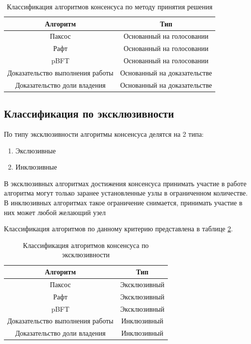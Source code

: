 \begin{table}[h!]
	\begin{center}
		\caption{Классификация алгоритмов консенсуса по методу принятия решения}
		\label{tbl:classif_method}
		\begin{tabular}{|c|c|}
		\hline
		\textbf{Алгоритм} & \textbf{Тип} \\
		\hline
		Паксос & Основанный на голосовании \\
		\hline
		Рафт & Основанный на голосовании \\
		\hline
		pBFT & Основанный на голосовании \\
		\hline
		Доказательство выполнения работы & Основанный на доказательстве \\
		\hline
		Доказательство доли владения & Основанный на доказательстве \\
		\hline
        \end{tabular}
	\end{center}        
\end{table}

        \subsection{Классификация по эксклюзивности}

            По типу эксклюзивности алгоритмы консенсуса делятся на 2 типа:
            
            \begin{enumerate}
                \item Экслюзивные
                \item Инклюзивные
            \end{enumerate}
            
            В эксклюзивных алгоритмах достижения консенсуса принимать участие в работе алгоритма могут только заранее установленные узлы в ограниченном количестве. В инклюзивных алгоритмах такое ограничение снимается, принимать участие в них может любой желающий узел
            
            Классификация алгоритмов по данному критерию представлена в таблице \ref{tbl:classif_inclusive}.
        
\begin{table}[h!]
	\begin{center}
		\caption{Классификация алгоритмов консенсуса по эксклюзивности}
		\label{tbl:classif_inclusive}
		\begin{tabular}{|c|c|}
		\hline
		\textbf{Алгоритм} & \textbf{Тип} \\
		\hline
		Паксос & Эксклюзивный \\
		\hline
		Рафт & Эксклюзивный \\
		\hline
		pBFT & Эксклюзивный \\
		\hline
		Доказательство выполнения работы & Инклюзивный \\
		\hline
		Доказательство доли владения & Инклюзивный \\
		\hline
        \end{tabular}
	\end{center}        
\end{table}
        
